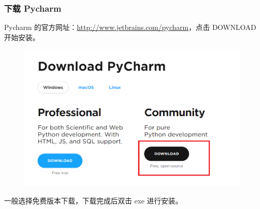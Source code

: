 \subsubsection{下载 Pycharm}


Pycharm 的官方网址：\href{http://www.jetbrains.com/pycharm}{http://www.jetbrains.com/pycharm}，点击 DOWNLOAD 开始安装。

\begin{figure}[!ht]
  \centering
  \includegraphics[scale=0.6]{figure/chapter1/pycharm.png}
\end{figure}

一般选择免费版本下载，下载完成后双击 exe 进行安装。

